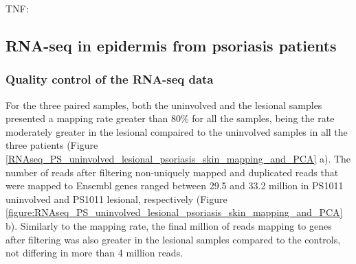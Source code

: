 TNF:


\subsection{RNA-seq in epidermis from psoriasis patients}
\subsubsection{Quality control of the RNA-seq data}
For the three paired samples, both the uninvolved and the lesional samples presented a mapping rate greater than 80\% for all the samples, being the rate moderately greater in the lesional compaired to the uninvolved samples in all the three patients (Figure \ref{RNAseq_PS_uninvolved_lesional_psoriasis_skin_mapping_and_PCA} a). The number of reads after filtering non-uniquely mapped and duplicated reads that were mapped to Ensembl genes ranged between 29.5 and 33.2 million in PS1011 uninvolved and PS1011 lesional, respectively (Figure \ref{figure:RNAseq_PS_uninvolved_lesional_psoriasis_skin_mapping_and_PCA} b). Similarly to the mapping rate, the final million of reads mapping to genes after filtering was also greater in the lesional samples compared to the controls, not differing in more than 4 million reads.


